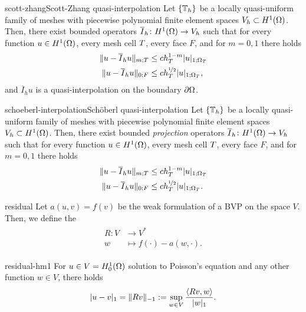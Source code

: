 \begin{Theorem*}{scott-zhang}{Scott-Zhang quasi-interpolation}
  Let $\{\mathbb T_h\}$ be a locally quasi-uniform family of meshes with
  piecewise polynomial finite element spaces
  $V_h\subset H^1(\Omega)$. Then, there exist bounded operators
  $\overline I_h\colon H^1(\Omega) \to V_h$ such that for every
  function $u\in H^1(\Omega)$, every mesh cell $T$, every face
  $F$, and for $m=0,1$ there holds
  \begin{align}
    \lVert u-\overline I_h u\rVert_{m;T} &\le c h_T^{1-m} \lvert u\rvert_{1;\Omega_T} \\
    \lVert u-\overline I_h u\rVert_{0;F} &\le c h_T^{\nicefrac{1}{2}} \lvert u\rvert_{1;\Omega_T},
  \end{align}
  and $\overline I_h u$ is a quasi-interpolation on the boundary $\partial\Omega$.
\end{Theorem*}

\begin{Theorem*}{schoeberl-interpolation}{Schöberl quasi-interpolation}
  Let $\{\mathbb T_h\}$ be a locally quasi-uniform family of meshes with
  piecewise polynomial finite element spaces
  $V_h\subset H^1(\Omega)$. Then, there exist bounded
  \emph{projection} operators
  $\overline I_h\colon H^1(\Omega) \to V_h$ such that for every
  function $u\in H^1(\Omega)$, every mesh cell $T$, every face
  $F$, and for $m=0,1$ there holds
  \begin{align}
    \lVert u-\overline I_h u\rVert_{m;T} &\le c h_T^{1-m} \lvert u\rvert_{1;\Omega_T} \\
    \lVert u-\overline I_h u\rVert_{0;F} &\le c h_T^{\nicefrac{1}{2}} \lvert u\rvert_{1;\Omega_T}.
  \end{align}  
\end{Theorem*}

\begin{Definition}{residual}
  Let $a(u,v) = f(v)$ be the weak formulation of a BVP on the space
  $V$.  Then, we define the 
\begin{gather}
  \begin{split}
    R\colon V &\to V^* \\
    w&\mapsto f(\cdot) - a(w,\cdot).
  \end{split}
\end{gather}
\end{Definition}
\begin{Lemma}{residual-hm1}
  For $u\in V=H^1_0(\Omega)$ solution to Poisson's equation and any
  other function $w\in V$, there holds
  \begin{gather}
    \lvert u-v\rvert_1 = \lVert R v\rVert_{-1}
    := \sup_{w\in V} \frac{\left<R v,w\right>}{\lvert w\rvert_1}.
  \end{gather}
\end{Lemma}

